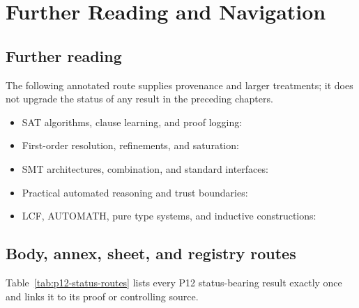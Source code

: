 \chapter{Further Reading and Navigation}
\label{sec:p12-further-reading}

\section{Further reading}

The following annotated route supplies provenance and larger treatments; it
does not upgrade the
status of any result in the preceding chapters.
\begin{itemize}
  \item SAT algorithms, clause learning, and proof logging:
        \par\parencite{DavisLogemannLoveland1962,MarquesSilvaSakallah1999}
        \par\parencite{MarquesSilvaLynceMalik2009,WetzlerHeuleHunt2014}
  \item First-order resolution, refinements, and saturation:
        \par\parencite{Robinson1965,WosRobinsonCarson1965}
        \par\parencite{Slagle1967,BachmairGanzinger2001}
  \item SMT architectures, combination, and standard interfaces:
        \par\parencite{NelsonOppen1979,NieuwenhuisOliverasTinelli2006}
        \par\parencite{BarrettSebastianiSeshiaTinelli2009,SMTLIB2025,TPTP}
  \item Practical automated reasoning and trust boundaries:
        \par\parencite{Harrison2009,Pollack1998}
  \item LCF, AUTOMATH, pure type systems, and inductive constructions:
        \par\parencite{GordonMilnerWadsworth1979,DeBruijn1970}
        \par\parencite{Barendregt1992,PaulinMohring2015}
\end{itemize}

\section{Body, annex, sheet, and registry routes}

Table~\ref{tab:p12-status-routes} lists every P12 status-bearing result exactly
once and links it to its proof or controlling source.

